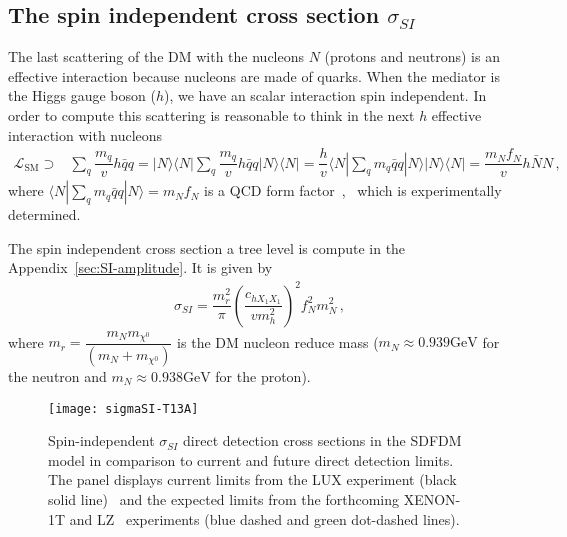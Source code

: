 \subsection{The spin independent cross section $\sigma_{SI}$}

The last scattering of the DM with the nucleons $N$ (protons and neutrons) is an effective interaction because nucleons are made of quarks. When the mediator is the Higgs gauge boson ($h$), we have an scalar interaction spin independent. In order to compute this scattering is reasonable to think in the next $h$ effective interaction with nucleons  
\begin{align}
\mathcal{L}_{\text{SM}}\supset & \sum_{q}\dfrac{m_q}{v}h\bar{q}q
= |N\rangle\langle N|\sum_{q}\dfrac{m_q}{v}h\bar{q}q |N\rangle\langle N|
= \dfrac{h}{v}\langle N|\sum_{q}m_q\bar{q}q|N\rangle |N\rangle\langle N|
=\dfrac{m_Nf_N}{v}h\bar{N}N\,,
\end{align}
where $\langle N|\sum_{q}m_q\bar{q}q|N\rangle=m_Nf_N$ is a QCD form factor~\cite{Belanger:2014vza},~\cite{Abdallah:2015ter} which is experimentally determined. 

The spin independent cross section a tree level is compute in the Appendix~\ref{sec:SI-amplitude}. It is given by
\begin{align}
\label{eq:SI-tree-level}
\sigma_{SI}=\dfrac{m_r^2}{\pi}\left(\dfrac{c_{hX_1X_1}}{vm_h^2}\right)^2f_N^2m_N^2\,,
\end{align}
%
where $m_r=\dfrac{m_Nm_{\chi^0}}{(m_N+m_{\chi^0})}$
is the DM nucleon reduce mass ($m_N\approx 0.939 \text{GeV}$ for the neutron and $m_N\approx 0.938 \text{GeV}$ for the proton). 

\begin{figure}[h]
\begin{center}
\texttt{[image: sigmaSI-T13A]}  
\caption{Spin-independent $\sigma_{SI}$  direct detection cross sections in the SDFDM model in comparison to current and future direct detection limits. 
The panel displays current limits from the LUX experiment (black solid line)~\cite{2013arXiv1310.8214L} and the expected limits from the forthcoming XENON-1T and LZ~\cite{Cushman:2013zza} experiments (blue dashed and green dot-dashed lines).
}
\label{fig:sigma-SI}
\end{center}
\end{figure}


